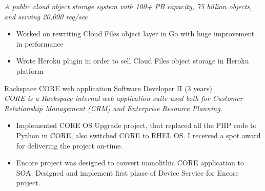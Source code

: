 \documentclass[margin,line]{resume}
\begin{document}
\begin{resume}
{\small\textit{A public cloud object storage system with 100+ PB capacity, 75 billion
objects, and serving 20,000 req/sec}}
\begin{itemize} \itemsep -2pt %
\small\item Worked on rewriting Cloud Files object layer in Go with huge improvement in performance
\small\item Wrote Heroku plugin in order to sell Cloud Files object storage in Heroku platform
\end{itemize}\vspace{-\baselineskip} %
\vspace{4pt}
{\small Rackspace CORE web application  \hfill  Software Developer II (3 years)}\\
{\small\textit{CORE is a Rackspace internal web application suite used both for Customer Relationship Management (CRM) and Enterprise Resource Planning.}}
\begin{itemize} \itemsep -2pt %
\small\item Implemented CORE OS Upgrade project, that replaced all the PHP code to Python in CORE, also switched CORE to RHEL OS. I received a spot award for delivering the project on-time. 
\small\item Encore project was designed to convert monolithic CORE application to SOA. Designed and implement first phase of Device Service for Encore project. 
\end{itemize}
\vspace{4pt}


\end{resume}
\end{document}
